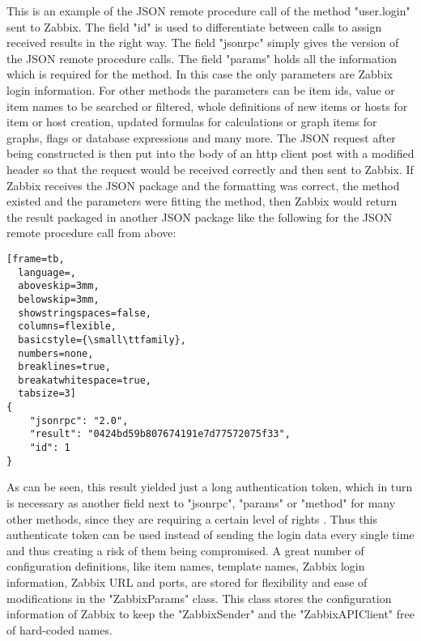	This is an example of the JSON remote procedure call of the method "user.login" sent to Zabbix. The field "id" is used to differentiate between calls to assign received results in the right way. The field "jsonrpc" simply gives the version of the JSON remote procedure calls. The field "params" holds all the information which is required for the method. In this case the only parameters are Zabbix login information. For other methods the parameters can be item ids, value or item names to be searched or filtered, whole definitions of new items or hosts for item or host creation, updated formulas for calculations or graph items for graphs, flags or database expressions and many more. The JSON request after being constructed is then put into the body of an http client post with a modified header so that the request would be received correctly and then sent to Zabbix. If Zabbix receives the JSON package and the formatting was correct, the method existed and the parameters were fitting the method, then Zabbix would return the result packaged in another JSON package like the following\cite{zab3} for the JSON remote procedure call from above:
	\begin{lstlisting}[frame=tb,
  language=,
  aboveskip=3mm,
  belowskip=3mm,
  showstringspaces=false,
  columns=flexible,
  basicstyle={\small\ttfamily},
  numbers=none,
  breaklines=true,
  breakatwhitespace=true,
  tabsize=3]
{
    "jsonrpc": "2.0",
    "result": "0424bd59b807674191e7d77572075f33",
    "id": 1
}
\end{lstlisting}
	As can be seen, this result yielded just a long authentication token, which in turn is necessary as another field next to "jsonrpc", "params" or "method" for many other methods, since they are requiring a certain level of rights \cite{zab3}. Thus this authenticate token can be used instead of sending the login data every single time and thus creating a risk of them being compromised.
	A great number of configuration definitions, like item names, template names, Zabbix login information, Zabbix URL and ports, are stored for flexibility and ease of modifications in the "ZabbixParams" class. This class stores the configuration information of Zabbix to keep the "ZabbixSender" and the "ZabbixAPIClient" free of hard-coded names.
